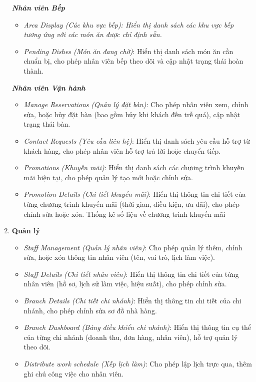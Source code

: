\begin{enumerate}
	      \textit{\textbf{Nhân viên Bếp}}
	      \begin{itemize}
		      \item \textit{Area Display (Các khu vực bếp): Hiển thị danh sách các khu vực bếp tương ứng với các món ăn được chỉ định sẵn.}
		      \item \textit{Pending Dishes (Món ăn đang chờ)}: Hiển thị danh sách món ăn cần chuẩn bị, cho phép nhân viên bếp theo dõi và cập nhật trạng thái hoàn thành.
	      \end{itemize}

	      \textit{\textbf{Nhân viên Vận hành}}
	      \begin{itemize}
		      \item \textit{Manage Reservations (Quản lý đặt bàn)}: Cho phép nhân viên xem, chỉnh sửa, hoặc hủy đặt bàn (bao gồm hủy khi khách đến trễ quá), cập nhật trạng thái bàn.
		      \item \textit{Contact Requests (Yêu cầu liên hệ)}: Hiển thị danh sách yêu cầu hỗ trợ từ khách hàng, cho phép nhân viên hỗ trợ trả lời hoặc chuyển tiếp.
		      \item \textit{Promotions (Khuyến mãi)}: Hiển thị danh sách các chương trình khuyến mãi hiện tại, cho phép quản lý tạo mới hoặc chỉnh sửa.
		      \item \textit{Promotion Details (Chi tiết khuyến mãi)}: Hiển thị thông tin chi tiết của từng chương trình khuyến mãi (thời gian, điều kiện, ưu đãi), cho phép chỉnh sửa hoặc xóa. Thống kê số liệu về chương trình khuyến mãi
	      \end{itemize}
	\item \textbf{Quản lý}
	      \begin{itemize}
		      \item \textit{Staff Management (Quản lý nhân viên)}: Cho phép quản lý thêm, chỉnh sửa, hoặc xóa thông tin nhân viên (tên, vai trò, lịch làm việc).
		      \item \textit{Staff Details (Chi tiết nhân viên)}: Hiển thị thông tin chi tiết của từng nhân viên (hồ sơ, lịch sử làm việc, hiệu suất), cho phép chỉnh sửa.
		      \item \textit{Branch Details (Chi tiết chi nhánh)}: Hiển thị thông tin chi tiết của chi nhánh, cho phép chỉnh sửa sơ đồ nhà hàng.
		      \item \textit{Branch Dashboard (Bảng điều khiển chi nhánh)}: Hiển thị thông tin cụ thể của từng chi nhánh (doanh thu, đơn hàng, nhân viên), hỗ trợ quản lý theo dõi.
		      \item \textit{Distribute work schedule (Xếp lịch làm)}: Cho phép lập lịch trực qua, thêm ghi chú công việc cho nhân viên.
	      \end{itemize}


\end{enumerate}
